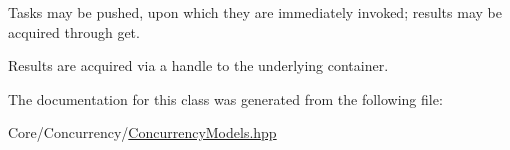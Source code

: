 Tasks may be pushed, upon which they are immediately invoked; results may be acquired through get. 

Results are acquired via a handle to the underlying container. 

The documentation for this class was generated from the following file\+:\begin{DoxyCompactItemize}
\item 
Core/\+Concurrency/\mbox{\hyperlink{_concurrency_models_8hpp}{Concurrency\+Models.\+hpp}}\end{DoxyCompactItemize}
